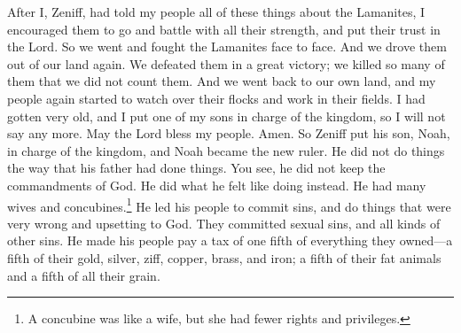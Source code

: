 After I, Zeniff, had told my people all of these things about the Lamanites, I encouraged them to go and battle with all their strength, and put their trust in the Lord. So we went and fought the Lamanites face to face.
\bverse \iffalse And it came to pass that we did drive them again out of our land; and we slew them with a great slaughter, even so many that we did not number them. \fi
And we drove them out of our land again. We defeated them in a great victory; we killed so many of them that we did not count them.
\bverse \iffalse And it came to pass that we returned again to our own land, and my people again began to tend their flocks, and to till their ground. \fi
And we went back to our own land, and my people again started to watch over their flocks and work in their fields.
\bverse \iffalse And now I, being old, did confer the kingdom upon one of my sons; therefore, I say no more. And may the Lord bless my people. Amen. \fi
I had gotten very old, and I put one of my sons in charge of the kingdom, so I will not say any more. May the Lord bless my people. Amen.
\bchapter
\bverse \iffalse And now it came to pass that Zeniff conferred the kingdom upon Noah, one of his sons; therefore Noah began to reign in his stead; and he did not walk in the ways of his father. \fi
So Zeniff put his son, Noah, in charge of the kingdom, and Noah became the new ruler. He did not do things the way that his father had done things.
\bverse \iffalse For behold, he did not keep the commandments of God, but he did walk after the desires of his own heart. And he had many wives and concubines. And he did cause his people to commit sin, and do that which was abominable in the sight of the Lord. Yea, and they did commit whoredoms and all manner of wickedness. \fi
You see, he did not keep the commandments of God. He did what he felt like doing instead. He had many wives and concubines.\footnote{A concubine was like a wife, but she had fewer rights and privileges.} He led his people to commit sins, and do things that were very wrong and upsetting to God. They committed sexual sins, and all kinds of other sins.
\bverse \iffalse And he laid a tax of one fifth part of all they possessed, a fifth part of their gold and of their silver, and a fifth part of their ziff, and of their copper, and of their brass and their iron; and a fifth part of their fatlings; and also a fifth part of all their grain. \fi
He made his people pay a tax of one fifth of everything they owned---a fifth of their gold, silver, ziff, copper, brass, and iron; a fifth of their fat animals and a fifth of all their grain.
